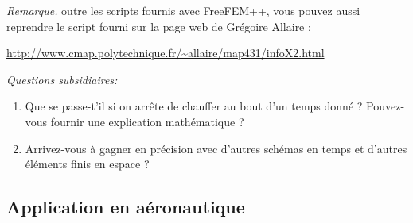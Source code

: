 {\it Remarque.} outre les scripts fournis avec FreeFEM++, vous pouvez aussi reprendre le script fourni sur la page web de Grégoire Allaire : 

\begin{center}
\url{http://www.cmap.polytechnique.fr/~allaire/map431/infoX2.html}
\end{center}

{\it Questions subsidiaires:

\begin{enumerate}

\item Que se passe-t'il si on arrête de chauffer au bout d'un temps donné ? Pouvez-vous fournir une explication mathématique ?

\item Arrivez-vous à gagner en précision avec d'autres schémas en temps et d'autres éléments finis en espace ?

\end{enumerate}

}

\subsection{Application en aéronautique}


